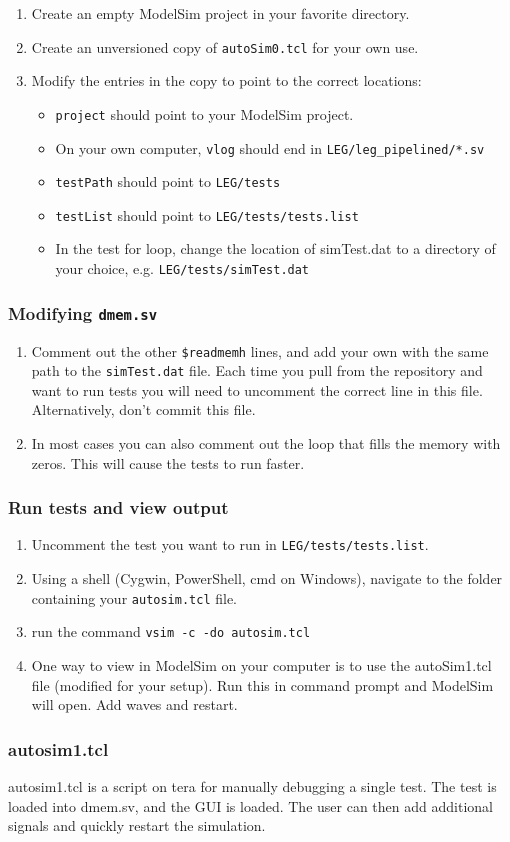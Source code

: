 \begin{enumerate}
	\item Create an empty ModelSim project in your favorite directory.
	\item Create an unversioned copy of \texttt{autoSim0.tcl} for your own use.
	\item Modify the entries in the copy to point to the correct locations:
	\begin{itemize}
		\item \texttt{project} should point to your ModelSim project.
		\item On your own computer, \texttt{vlog} should end in \texttt{LEG/leg\_pipelined/*.sv}
		\item \texttt{testPath} should point to \texttt{LEG/tests}
		\item \texttt{testList} should point to \texttt{LEG/tests/tests.list}
		\item In the test for loop, change the location of simTest.dat to a directory 
		of your choice, e.g. \texttt{LEG/tests/simTest.dat}
	\end{itemize}
\end{enumerate}

\subsubsection{Modifying \texttt{dmem.sv}}

\begin{enumerate}

\item Comment out the other \texttt{\$readmemh} lines, and add your own with 
the same path to the \texttt{simTest.dat} file. Each time you pull from 
the repository and want to run tests you will need to uncomment 
the correct line in this file. Alternatively, don't commit this file.

\item In most cases you can also comment out the loop that fills the memory with zeros. 
This will cause the tests to run faster.
\end{enumerate}


\subsubsection{Run tests and view output}

\begin{enumerate}
	\item Uncomment the test you want to run in \texttt{LEG/tests/tests.list}.
	\item Using a shell (Cygwin, PowerShell, cmd on Windows), 
	navigate to the folder containing your \texttt{autosim.tcl} file. 
	\item run the command \texttt{vsim -c -do autosim.tcl}
	\item One way to view in ModelSim on your computer is to use the autoSim1.tcl file
	(modified for your setup). Run this in command prompt and ModelSim will open. Add waves and restart.
\end{enumerate}

\subsubsection{autosim1.tcl}
autosim1.tcl is a script on tera for manually debugging a single test. 
The test is loaded into dmem.sv, and the GUI is loaded. 
The user can then add additional signals and quickly restart the simulation. 
